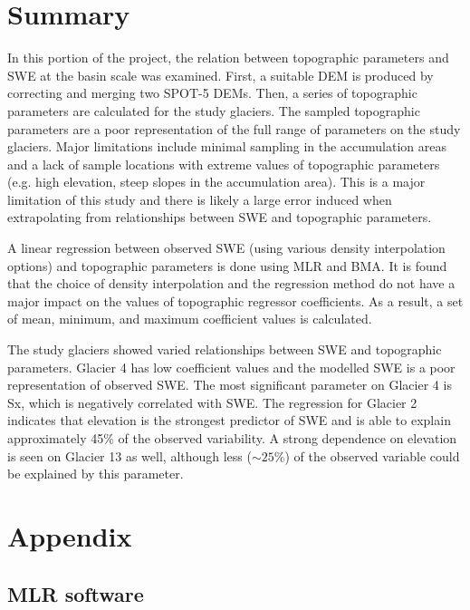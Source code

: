\documentclass[12pt]{article}
\begin{document}

\section{Summary}

In this portion of the project, the relation between topographic parameters and SWE at the basin scale was examined. First, a suitable DEM is produced by correcting and merging two SPOT-5 DEMs. Then, a series of topographic parameters are calculated for the study glaciers. The sampled topographic parameters are a poor representation of the full range of parameters on the study glaciers. Major limitations include minimal sampling in the accumulation areas and a lack of sample locations with extreme values of topographic parameters (e.g. high elevation, steep slopes in the accumulation area). This is a major limitation of this study and there is likely a large error induced when extrapolating from relationships between SWE and topographic parameters. 

A linear regression between observed SWE (using various density interpolation options) and topographic parameters is done using MLR and BMA. It is found that the choice of density interpolation and the regression method do not have a major impact on the values of topographic regressor coefficients. As a result, a set of mean, minimum, and maximum coefficient values is calculated. 

The study glaciers showed varied relationships between SWE and topographic parameters. Glacier 4 has low coefficient values and the modelled SWE is a poor representation of observed SWE. The most significant parameter on Glacier 4 is Sx, which is negatively correlated with SWE. The regression for Glacier 2 indicates that elevation is the strongest predictor of SWE and is able to explain approximately 45\% of the observed variability.  A strong dependence on elevation is seen on Glacier 13 as well, although less ($\sim25\%$) of the observed variable could be explained by this parameter. 

 

\section{Appendix}

	\subsection{MLR software}
\label{sec:MLRMethods}
\end{document}
